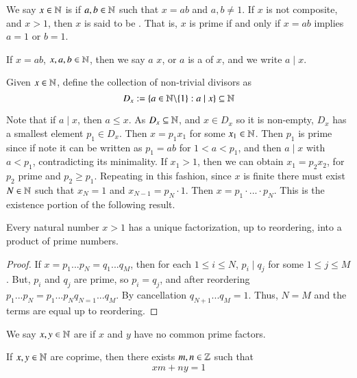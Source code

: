 \begin{defn}
    We say $x \in \mathbb N$ is  if $a,b \in \mathbb N$ such that $x = ab$ and $a,b \neq 1$. If $x$ is not composite, and $x > 1$, then $x$ is said to be . That is, $x$ is prime if and only if $x = ab$ implies $a = 1$ or $b =1$.
\end{defn}

\begin{defn}
    If $x = ab$, $x,a,b \in \mathbb N$, then we say $a$  $x$, or $a$ is a  of $x$, and we write $a\;\vert\;x$.
\end{defn}

\begin{defn}
    Given $x \in \mathbb N$, define the collection of non-trivial divisors as $$D_x := \{a \in \mathbb N\backslash\{1\}:a\;\vert\;x\} \subseteq \mathbb N$$
\end{defn}

Note that if $a \;\vert\;x$, then $a \leq x$. As $D_x \subseteq \mathbb N$, and $x \in D_x$ so it is non-empty, $D_x$ has a smallest element $p_1 \in D_x$. Then $x = p_1x_1$ for some $x_1 \in \mathbb N$. Then $p_1$ is prime since if note it can be written as $p_1 = ab$ for $1 < a < p_1$, and then $a\;\vert\;x$ with $a < p_1$, contradicting its minimality. If $x_1 > 1$, then we can obtain $x_1 = p_2x_2$, for $p_2$ prime and $p_2 \geq p_1$. Repeating in this fashion, since $x$ is finite there must exist $N \in \mathbb N$ such that $x_N = 1$ and $x_{N-1} = p_N\cdot 1$. Then $x = p_1\cdot ...\cdot p_N$. This is the existence portion of the following result.

\begin{namthm}
    Every natural number $x > 1$ has a unique factorization, up to reordering, into a product of prime numbers.
\end{namthm}
\begin{proof}
    If $x = p_1...p_N = q_1...q_M$, then for each $1 \leq i\leq N$, $p_i\;\vert\;q_j$ for some $1 \leq j \leq M$. But, $p_i$ and $q_j$ are prime, so $p_i = q_j$, and after reordering $p_1 ...p_N = p_1...p_Nq_{N=1}...q_M$. By cancellation $q_{N+1}...q_M = 1$. Thus, $N = M$ and the terms are equal up to reordering.
\end{proof}

\begin{defn}
    We say $x,y \in \mathbb N$ are  if $x$ and $y$ have no common prime factors.
\end{defn}

\begin{prop}
    If $x,y \in \mathbb N$ are coprime, then there exists $m,n \in \mathbb Z$ such that $$xm+ny = 1$$
\end{prop}

